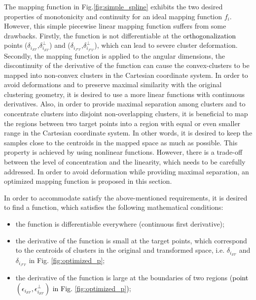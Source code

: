 The mapping function in Fig.\ref{fig:simple_spline} exhibits the two desired properties of monotonicity and continuity for an ideal mapping function $f_i$. However, this simple piecewise linear mapping function suffers from some drawbacks. Firstly, the function is not differentiable at the \textcolor{black}{orthogonalization} points ($\delta_{i_{{\mathcal{SV}}}}$,$\delta^{\perp}_{i_{{\mathcal{SV}}}}$) and ($\delta_{i_{{\mathcal{FV}}}}$,$\delta^{\perp}_{i_{{\mathcal{FV}}}}$), which can lead to severe cluster deformation. Secondly, the mapping function is applied to the angular dimensions, the discontinuity of the derivative of  %
the function can cause the convex-clusters to be mapped into non-convex clusters in the Cartesian coordinate system. In order to avoid deformations and to preserve maximal similarity with the original clustering geometry, it is desired to use a more linear functions with continuous derivatives. Also, in order to provide maximal separation among clusters and to concentrate clusters into disjoint non-overlapping clusters, it is beneficial to map the regions between two target points into a region with equal or even smaller range in the Cartesian coordinate system. In other words, it is desired to keep the samples close to the centroids in the mapped space as much as possible. This property is achieved by using nonlinear functions. However, there is a trade-off between the level of concentration and the linearity, which needs to be carefully addressed.  In order to avoid deformation while providing maximal separation, an optimized mapping function is proposed in this section.

In order to accommodate satisfy the above-mentioned requirements, it is desired to find a function, which satisfies the following mathematical conditions:

\begin{itemize}
\item the function is differentiable everywhere (continuous first derivative);
\item the derivative of the function is small at the target points, which correspond to the centroids of clusters in the original and transformed space, i.e. $\delta_{i_{{\mathcal{SV}}}}$ and $\delta_{i_{{\mathcal{FV}}}}$ in Fig. \ref{fig:optimized_p};
\item the derivative of the function is large at the boundaries of two regions (\textcolor{black}{point $(\epsilon_{i_{{\mathcal{SV}}}},\epsilon^{\perp}_{i_{{\mathcal{SV}}}})$ in Fig. \ref{fig:optimized_p})};
\end{itemize}


